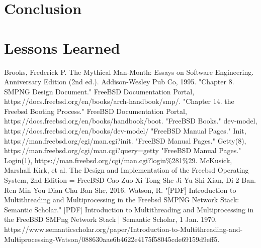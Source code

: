 \documentclass[12pt, dvipsnames, a4paper]{article}
\begin{document}
\section{Conclusion}
\lipsum[1]

\section{Lessons Learned}
\lipsum[1]

\begin{thebibliography}{00}
	 Brooks, Frederick P. The Mythical Man-Month: Essays on Software Engineering. Anniversary Edition (2nd ed.). Addison-Wesley Pub Co, 1995.
	 "Chapter 8. SMPNG Design Document." FreeBSD Documentation Portal, https://docs.freebsd.org/en/books/arch-handbook/smp/.
	 "Chapter 14. the Freebsd Booting Process." FreeBSD Documentation Portal, https://docs.freebsd.org/en/books/handbook/boot.
	 "FreeBSD Books." dev-model, https://docs.freebsd.org/en/books/dev-model/
	 "FreeBSD Manual Pages." Init, https://man.freebsd.org/cgi/man.cgi?init.
	 "FreeBSD Manual Pages." Getty(8), https://man.freebsd.org/cgi/man.cgi?query=getty
	 "FreeBSD Manual Pages." Login(1), https://man.freebsd.org/cgi/man.cgi?login\%281\%29.
	 McKusick, Marshall Kirk, et al. The Design and Implementation of the Freebsd Operating System, 2nd Edition = FreeBSD Cao Zuo Xi Tong She Ji Yu Shi Xian, Di 2 Ban. Ren Min You Dian Chu Ban She, 2016.
	 Watson, R. "[PDF] Introduction to Multithreading and Multiprocessing in the Freebsd SMPNG Network Stack: Semantic Scholar." [PDF]  Introduction to Multithreading and Multiprocessing in the FreeBSD SMPng Network Stack | Semantic Scholar, 1 Jan. 1970, https://www.semanticscholar.org/paper/Introduction-to-Multithreading-and-Multiprocessing-Watson/088630aae6b4622e4175f58045cde69159d9eff5.
\end{thebibliography}
\end{document}
